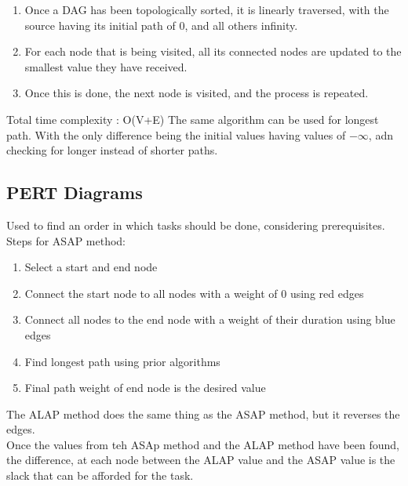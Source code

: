 \documentclass[nobib]{tufte-handout}
\begin{document}
\begin{enumerate}
    \item Once a DAG has been topologically sorted, it is linearly traversed, with the source having its initial path of 0, and all others infinity.
    \item For each node that is being visited, all its connected nodes are updated to the smallest value they have received.
    \item Once this is done, the next node is visited, and the process is repeated.
\end{enumerate}
Total time complexity : O(V+E)
The same algorithm can be used for longest path. With the only difference being the initial values having values of $-\infty$, adn checking for longer instead of shorter paths.\\
\subsection{PERT Diagrams}
Used to find an order in which tasks should be done, considering prerequisites.\\
Steps for ASAP method:
\begin{enumerate}
    \item Select a start and end node
    \item Connect the start node to all nodes with a weight of 0 using red edges
    \item Connect all nodes to the end node with a weight of their duration using blue edges
    \item Find longest path using prior algorithms
    \item Final path weight of end node is the desired value
\end{enumerate}
The ALAP method does the same thing as the ASAP method, but it reverses the edges.\\
Once the values from teh ASAp method and the ALAP method have been found, the difference, at each node between the ALAP value and the ASAP value is the slack that can be afforded for the task.\\
\end{document}
